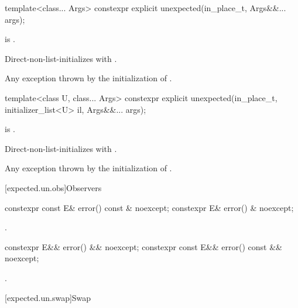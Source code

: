 %
\begin{itemdecl}
template<class... Args>
  constexpr explicit unexpected(in_place_t, Args&&... args);
\end{itemdecl}

\begin{itemdescr}
\pnum
\constraints
{} is .

\pnum
\effects
Direct-non-list-initializes
 with .

\pnum
\throws
Any exception thrown by the initialization of .
\end{itemdescr}

%
\begin{itemdecl}
template<class U, class... Args>
  constexpr explicit unexpected(in_place_t, initializer_list<U> il, Args&&... args);
\end{itemdecl}

\begin{itemdescr}
\pnum
\constraints
{} is .

\pnum
\effects
Direct-non-list-initializes
 with .

\pnum
\throws
Any exception thrown by the initialization of .
\end{itemdescr}

[expected.un.obs]{Observers}

%
\begin{itemdecl}
constexpr const E& error() const & noexcept;
constexpr E& error() & noexcept;
\end{itemdecl}

\begin{itemdescr}
\pnum
\returns
{}.
\end{itemdescr}

%
\begin{itemdecl}
constexpr E&& error() && noexcept;
constexpr const E&& error() const && noexcept;
\end{itemdecl}

\begin{itemdescr}
\pnum
\returns
{}.
\end{itemdescr}

[expected.un.swap]{Swap}

